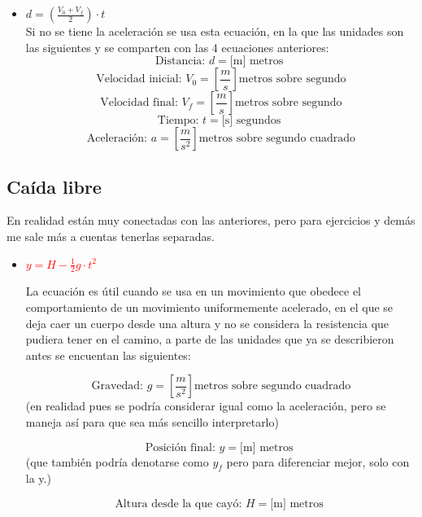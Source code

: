\documentclass[letterpaper, 12pt]{article}
\begin{document}
\begin{itemize}
        \item[\textcolor{Simbolos}{\blacksquare}]
        $d=\left( \frac{V_{0}+V_{f}}{2} \right) \cdot t $\\
        
        Si no se tiene la aceleración se usa esta ecuación, en la que las unidades son las siguientes y se comparten con las 4 ecuaciones anteriores:\\
        
        $$\textrm{Distancia: } d= \textrm{[m] metros }$$
        $$\textrm{Velocidad inicial: }V_{0} = \left[ \frac{m}{s} \right] \textrm{metros sobre segundo} $$
        $$\textrm{Velocidad final: }V_{f} = \left[ \frac{m}{s} \right] \textrm{metros sobre segundo} $$
        $$\textrm{Tiempo: } t= \textrm{[s] segundos }$$
        $$\textrm{Aceleración: } a = \left[ \frac{m}{s^{2}} \right] \textrm{metros sobre segundo cuadrado} $$
    \end{itemize}
    
    \newpage
    \pagestyle{fancy}
            \fancyhf{}
            \cfoot{\thepage}
                 
    \subsection*{Caída libre}
    
    En realidad están muy conectadas con las anteriores, pero para ejercicios y demás me sale más a cuentas tenerlas separadas.
    
    \begin{itemize}
        \item[\textcolor{Simbolos}{\blacksquare}] {\textcolor{red}{$y = H -\frac{1}{2} g\cdot t^{2}$}}
        
        La ecuación es útil cuando se usa en un movimiento que obedece el comportamiento de un movimiento uniformemente acelerado, en el que se deja caer un cuerpo desde una altura y no se considera la resistencia que pudiera tener en el camino, a parte de las unidades que ya se describieron antes se encuentan las siguientes:
        
        $$\textrm{Gravedad: } g = \left[ \frac{m}{s^{2}} \right] \textrm{metros sobre segundo cuadrado} $$ (en realidad pues se podría considerar igual como la aceleración, pero se maneja así para que sea más sencillo interpretarlo)
        
        $$\textrm{Posición final: } y= \textrm{[m] metros }$$ (que también podría denotarse como $y_{f}$ pero para diferenciar mejor, solo con la y.)
        
        $$\textrm{Altura desde la que cayó: } H= \textrm{[m] metros }$$ 
        
    \end{itemize}
    
\end{document}
